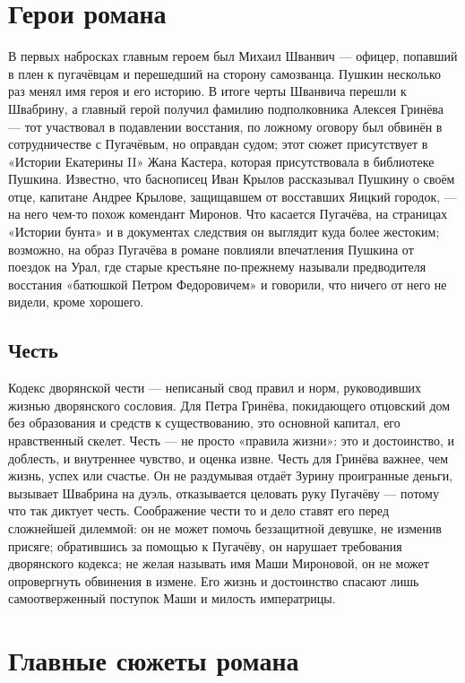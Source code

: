 \documentclass[a4paper,12pt]{article}
\begin{document}
\section{Герои романа}
В первых набросках главным героем был Михаил Шванвич — офицер, попавший в плен к пугачёвцам и перешедший на сторону самозванца. Пушкин несколько раз менял имя героя и его историю. В итоге черты Шванвича перешли к Швабрину, а главный герой получил фамилию подполковника Алексея Гринёва — тот участвовал в подавлении восстания, по ложному оговору был обвинён в сотрудничестве с Пугачёвым, но оправдан судом; этот сюжет присутствует в «Истории Екатерины II» Жана Кастера, которая присутствовала в библиотеке Пушкина. Известно, что баснописец Иван Крылов рассказывал Пушкину о своём отце, капитане Андрее Крылове, защищавшем от восставших Яицкий городок, — на него чем-то похож комендант Миронов. Что касается Пугачёва, на страницах «Истории бунта» и в документах следствия он выглядит куда более жестоким; возможно, на образ Пугачёва в романе повлияли впечатления Пушкина от поездок на Урал, где старые крестьяне по-прежнему называли предводителя восстания «батюшкой Петром Федоровичем» и говорили, что ничего от него не видели, кроме хорошего.
\subsection{Честь}
Кодекс дворянской чести — неписаный свод правил и норм, руководивших жизнью дворянского сословия. Для Петра Гринёва, покидающего отцовский дом без образования и средств к существованию, это основной капитал, его нравственный скелет. Честь — не просто «правила жизни»: это и достоинство, и доблесть, и внутреннее чувство, и оценка извне. Честь для Гринёва важнее, чем жизнь, успех или счастье. Он не раздумывая отдаёт Зурину проигранные деньги, вызывает Швабрина на дуэль, отказывается целовать руку Пугачёву — потому что так диктует честь. Соображение чести то и дело ставят его перед сложнейшей дилеммой: он не может помочь беззащитной девушке, не изменив присяге; обратившись за помощью к Пугачёву, он нарушает требования дворянского кодекса; не желая называть имя Маши Мироновой, он не может опровергнуть обвинения в измене. Его жизнь и достоинство спасают лишь самоотверженный поступок Маши и милость императрицы.

\section{Главные сюжеты романа}
\end{document}
